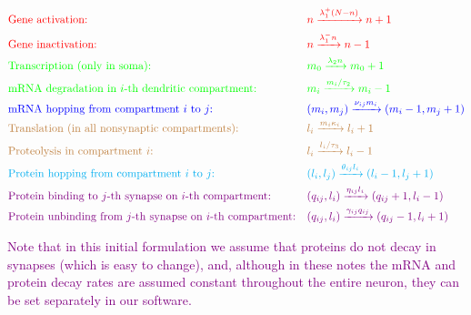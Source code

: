 \documentclass[a4paper, 11pt]{article}
\begin{document}
\begin{align*}
  &\textcolor{red}{\text{Gene activation:}} \quad &&\textcolor{red}{n \xrightarrow[]{\lambda_1^+(N-n)} n+1}\\
  &\textcolor{red}{\text{Gene inactivation:}}  &&\textcolor{red}{n \xrightarrow[]{\lambda_1^-n} n-1}\\
  &\textcolor{green}{\text{Transcription (only in soma):}} &&\textcolor{green}{m_0 \xrightarrow[]{\lambda_2n} m_0+1}\\
  &\textcolor{green}{\text{mRNA degradation in $i$-th dendritic compartment:}} &&\textcolor{green}{m_i \xrightarrow[]{m_i/\tau_2} m_i-1}\\
  &\textcolor{blue}{\text{mRNA hopping from compartment $i$ to $j$:}} &&\textcolor{blue}{(m_i, m_j) \xrightarrow[]{\nu_{ij}m_i} (m_i-1, m_j+1)}\\
  &\textcolor{brown}{\text{Translation (in all nonsynaptic compartments):}} &&\textcolor{brown}{l_i \xrightarrow[]{m_i\kappa_i} l_i+1}\\
  &\textcolor{brown}{\text{Proteolysis in compartment $i$:}} &&\textcolor{brown}{l_i \xrightarrow[]{l_i/\tau_3} l_i-1}\\
  &\textcolor{cyan}{\text{Protein hopping from compartment $i$ to $j$:}} &&\textcolor{cyan}{(l_i, l_j) \xrightarrow[]{\theta_{ij}l_i} (l_i-1, l_j+1)}\\
  &\textcolor{violet}{\text{Protein binding to $j$-th synapse on $i$-th compartment:}} &&\textcolor{violet}{(q_{ij}, l_i) \xrightarrow[]{\eta_{ij}l_i} (q_{ij}+1, l_i-1)}\\
  &\textcolor{violet}{\text{Protein unbinding from $j$-th synapse on $i$-th compartment:}} &&\textcolor{violet}{(q_{ij}, l_i) \xrightarrow[]{\gamma_{ij}q_{ij}} (q_{ij}-1, l_i+1)}
\end{align*}

\textcolor{purple}{Note that in this initial formulation we assume that proteins do not decay in synapses (which is easy to change), and, although in these notes the mRNA and protein decay rates are assumed constant throughout the entire neuron, they can be set separately in our software.}%
  
\end{document}
